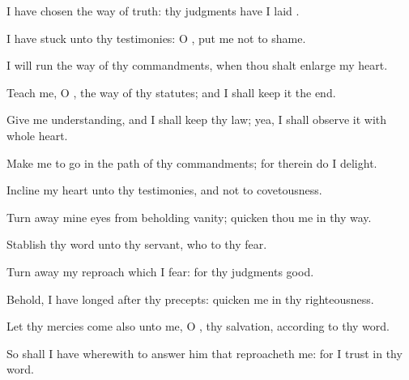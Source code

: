 {\Q {}I have
chosen the
way of
truth: thy
judgments have I
laid
{}.


\par }{\Q {}I have
stuck unto thy
testimonies: O
{}, put me not to
shame.


\par }{\Q {}I will
run the
way of thy
commandments, when thou shalt
enlarge my
heart.


\par }{\BB \par }
{
\par }
{\Q {}Teach me, O
{}, the
way of thy
statutes; and I shall
keep it
{} the
end.


\par }{\Q {}Give me
understanding, and I shall
keep thy
law; yea, I shall
observe it with
{} whole
heart.


\par }{\BB \par }
{\Q {}Make me to
go in the
path of thy
commandments; for therein do I
delight.


\par }{\Q {}Incline my
heart unto thy
testimonies, and not to
covetousness.


\par }{\Q {}Turn
away mine
eyes from
beholding
vanity;
{}
quicken thou me in thy
way.


\par }{\Q {}Stablish thy
word unto thy
servant, who
{} to thy
fear.


\par }{\Q {}Turn
away my
reproach which I
fear: for thy
judgments
{}
good.


\par }{\Q {}Behold, I have
longed after thy
precepts:
quicken me in thy
righteousness.


\par }{\BB \par }
{
\par }
{\Q {}Let thy
mercies
come also unto me, O
{},
{} thy
salvation, according to thy
word.


\par }{\Q {}So shall I have
wherewith to
answer him that
reproacheth me: for I
trust in thy
word.


\par }{\BB \par }
